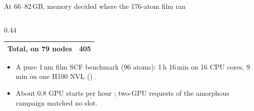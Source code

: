 \begin{frame}[t]{At 66--82\,GB, memory decided where the 176-atom film ran}
\begin{columns}[T,onlytextwidth]
\begin{column}{0.44\textwidth}
{\begin{tabular}{@{}lr@{}}
        \midrule
        Total, on 79 nodes & 405 \\
        \bottomrule
      \end{tabular}\par}
      \vspace{1mm}
      \begin{itemize}
        \item A pure 1\,nm film SCF benchmark (96 atoms): 1\,h 16\,min on 16 CPU cores, 9\,min on one H100 NVL ()
          .
        \item About 0.8 GPU starts per hour ; two-GPU requests of the amorphous campaign matched no
          slot.
      \end{itemize}
    \end{column}
  \end{columns}
\end{frame}
